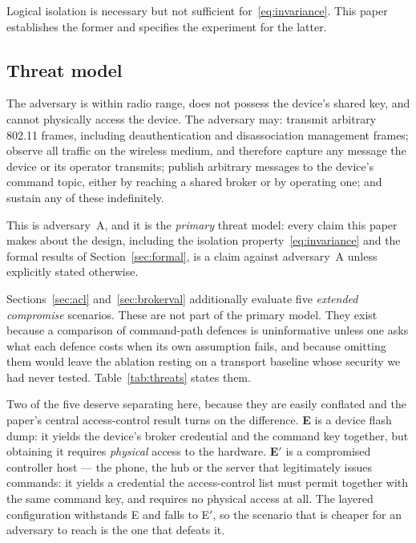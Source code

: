 Logical isolation is necessary but not sufficient for~\eqref{eq:invariance}. This paper
establishes the former and specifies the experiment for the latter.

\subsection{Threat model}

The adversary is within radio range, does not possess the device's shared key, and cannot
physically access the device. The adversary may:
transmit arbitrary 802.11 frames, including deauthentication and disassociation management
frames; observe all traffic on the wireless medium, and therefore capture any message the device
or its operator transmits; publish arbitrary messages to the device's command topic, either by
reaching a shared broker or by operating one; and sustain any of these indefinitely.

This is adversary~A, and it is the \emph{primary} threat model: every claim this paper makes
about the design, including the isolation property~\eqref{eq:invariance} and the formal results
of Section~\ref{sec:formal}, is a claim against adversary~A unless explicitly stated otherwise.

Sections~\ref{sec:acl} and~\ref{sec:brokerval} additionally evaluate five \emph{extended
compromise} scenarios. These are not part of the primary model. They exist because a comparison
of command-path defences is uninformative unless one asks what each defence costs when its own
assumption fails, and because omitting them would leave the ablation resting on a transport
baseline whose security we had never tested. Table~\ref{tab:threats} states them.

Two of the five deserve separating here, because they are easily conflated and the paper's
central access-control result turns on the difference. \textbf{E} is a device flash dump: it yields
the device's broker credential and the command key together, but obtaining it requires
\emph{physical} access to the hardware. \textbf{E}$'$ is a compromised controller host --- the phone,
the hub or the server that legitimately issues commands: it yields a credential the
access-control list must permit together with the same command key, and requires no physical
access at all. The layered configuration withstands E and falls to E$'$, so the scenario that is
cheaper for an adversary to reach is the one that defeats it.

